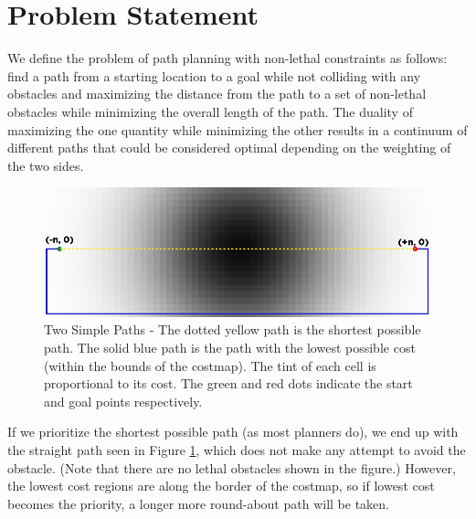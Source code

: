 \section{Problem Statement}

We define the problem of path planning with non-lethal constraints as follows: find a path from a starting location to a goal while not colliding with any obstacles and maximizing the distance from the path to a set of non-lethal obstacles while minimizing the overall length of the path. The duality of maximizing the one quantity while minimizing the other results in a continuum of different paths that could be considered optimal depending on the weighting of the two sides. 

\begin{figure}
\includegraphics[width=\columnwidth]{graphix/TwoPaths.png}
\caption{Two Simple Paths - The dotted yellow path is the shortest possible path. The solid blue path is the path with the lowest possible cost (within the bounds of the costmap). The tint of each cell is proportional to its cost. The green and red dots indicate the start and goal points respectively. }
\label{fig:twopaths}
\end{figure}


If we prioritize the shortest possible path (as most planners do), we end up with the straight path seen in Figure \ref{fig:twopaths}, which does not make any attempt to avoid the obstacle. (Note that there are no lethal obstacles shown in the figure.) However, the lowest cost regions are along the border of the costmap, so if lowest cost becomes the priority, a longer more round-about path will be taken. 

